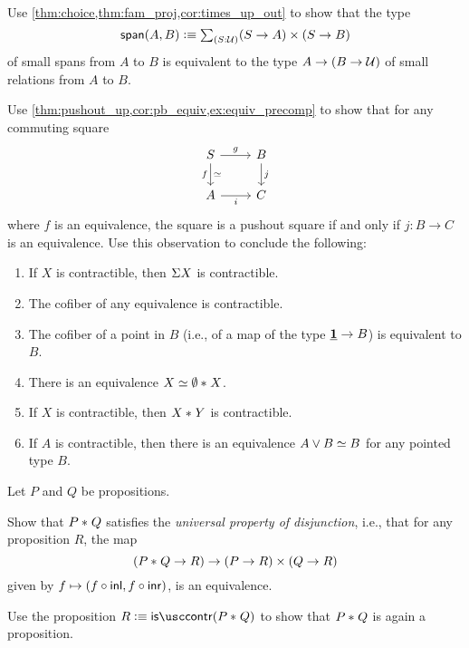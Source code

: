 \begin{exercises}
\item \label{ex:span_rel}Use \cref{thm:choice,thm:fam_proj,cor:times_up_out} to show that the type 
\begin{equation*}
\mathsf{span}(A,B)\defeq \sm{S:\UU} (S\to A)\times (S\to B)
\end{equation*}
of small spans from $A$ to $B$ is equivalent to the type $A\to (B\to\mathcal{U})$ of small relations from $A$ to $B$.
\item \label{ex:pushout_equiv}Use \cref{thm:pushout_up,cor:pb_equiv,ex:equiv_precomp} to show that for any commuting square
\begin{equation*}
\begin{tikzcd}
S \arrow[r,"g"] \arrow[d,swap,"f","{\eqvsym}"'] & B \arrow[d,"j"] \\
A \arrow[r,swap,"i"] & C
\end{tikzcd}
\end{equation*} 
where $f$ is an equivalence, the square is a pushout square if and only if $j:B\to C$ is an equivalence.
Use this observation to conclude the following:
\begin{enumerate}
\item If $X$ is contractible, then $\Sigma X$ is contractible.
\item The cofiber of any equivalence is contractible.
\item The cofiber of a point in $B$ (i.e., of a map of the type $\underline{\mathbf{1}}\to B$) is equivalent to $B$.
\item There is an equivalence $\eqv{X}{\join{\emptyt}{X}}$.
\item If $X$ is contractible, then ${X}\ast_{}{Y}$ is contractible. 
\item If $A$ is contractible, then there is an equivalence $\eqv{A\vee B}{B}$ for any pointed type $B$.
\end{enumerate}
\item \label{ex:join_propositions}Let $P$ and $Q$ be propositions.
\begin{subexenum}
\item Show that ${P}\ast_{}{Q}$ satisfies the \emph{universal property of disjunction}, i.e., that for any proposition $R$, the map
\begin{equation*}
({P}\ast_{}{Q}\to R)\to (P\to R)\times (Q\to R)
\end{equation*}
given by $f\mapsto (f\circ {\mathsf{inl}},f\circ {\mathsf{inr}})$, is an equivalence.
\item Use the proposition $R\defeq\iscontr(\join{P}{Q})$ to show that ${P}\ast_{}{Q}$ is again a proposition.

\end{subexenum}
\end{exercises}
